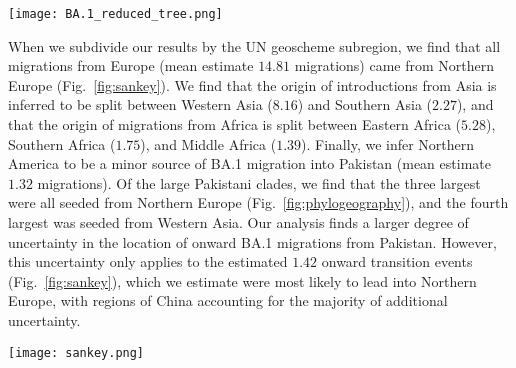 \begin{figure*}[ht]
   \centering
   \texttt{[image: BA.1\_reduced\_tree.png]}
    \caption{Results of our Bayesian phylogeographic analysis. (A) time-calibrated, reduced maximum clade credibility phylogenetic tree where all taxa from non-Pakistan (or travel history) locations have been hidden. Branches along the tree remain colored by the inferred region of the ancestral strain. Three large Pakistani clades cumulatively representing roughly half of the Pakistani sequences considered in this analysis. (B) distribution of importations to Pakistan by region. (C) Distribution over time of the inferred number of weekly importations to Pakistan, divided by inferred source. (D) individual Pakistani clade count distribution in the MCC tree; most clades are inferred as singletons, representing roughly half of the sequences in the tree.}
    \label{fig:phylogeography}
\end{figure*}

When we subdivide our results by the UN geoscheme subregion, we find that all migrations from Europe (mean estimate $14.81$ migrations) came from Northern Europe (Fig.~\ref{fig:sankey}).
We find that the origin of introductions from Asia is inferred to be split between Western Asia ($8.16$) and Southern Asia ($2.27$), and that the origin of migrations from Africa is split between Eastern Africa ($5.28$), Southern Africa ($1.75$), and Middle Africa ($1.39$).
Finally, we infer Northern America to be a minor source of BA.1 migration into Pakistan (mean estimate $1.32$ migrations).
Of the large Pakistani clades, we find that the three largest were all seeded from Northern Europe (Fig.~\ref{fig:phylogeography}), and the fourth largest was seeded from Western Asia.
Our analysis finds a larger degree of uncertainty in the location of onward BA.1 migrations from Pakistan. However, this uncertainty only applies to the estimated $1.42$ onward transition events (Fig.~\ref{fig:sankey}), which we estimate were most likely to lead into Northern Europe, with regions of China accounting for the majority of additional uncertainty.

\begin{figure*}[ht]
   \centering
   \texttt{[image: sankey.png]}
    \caption{Sankey diagram illustrating inferred BA.1 migrations into (mean estimate $35.12$ migrations) and out of (mean estimate $1.42$ migrations) Pakistan. Northern Europe is the source of all inferred migrations to Pakistan from Europe, representing a plurality of importations from both a region and sub-region geographic resolutions.}
    \label{fig:sankey}
\end{figure*}

